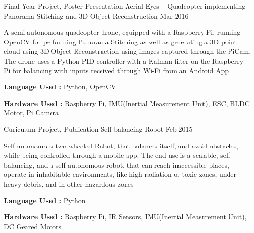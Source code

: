

\begin{cventries}
  \cventry
    {Final Year Project, Poster Presentation} %
    {Aerial Eyes – Quadcopter implementing Panorama Stitching and 3D Object Reconstruction} %
    {} %
    {Mar 2016} %
    {
      \begin{cvitems}
      \item{A semi-autonomous quadcopter drone, equipped with a Raspberry Pi, running OpenCV for performing Panorama Stitching as well as generating a 3D point cloud using 3D Object Reconstruction using images captured through the PiCam. The drone uses a Python PID controller with a Kalman filter on the Raspberry Pi for balancing with inputs received through Wi-Fi from an Android App}
      \item{\textbf{Language Used :} Python, OpenCV}
      \item{\textbf{Hardware Used :} Raspberry Pi, IMU(Inertial Measurement Unit), ESC, BLDC Motor, Pi Camera}
      \end{cvitems}
    }
  \cventry
    {Curiculum Project, Publication} %
    {Self-balancing Robot} %
    {} %
    {Feb 2015} %
    {
      \begin{cvitems}
      \item{Self-autonomous two wheeled Robot, that balances itself, and avoid obstacles, while being controlled through a mobile app. The end use is a scalable, self-balancing, and a self-autonomous robot, that can reach inaccessible places, operate in inhabitable environments, like high radiation or toxic zones, under heavy debris, and in other hazardous zones}
      \item{\textbf{Language Used :} Python}
      \item{\textbf{Hardware Used :} Raspberry Pi, IR Sensors, IMU(Inertial Measurement Unit), DC Geared Motors}
      \end{cvitems}
    }


\end{cventries}

